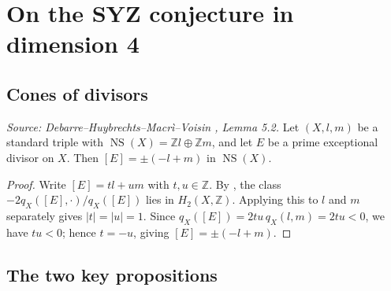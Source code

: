 \section{On the SYZ conjecture in dimension 4}

\subsection{Cones of divisors}

\begin{lemma}
  \label{lem:prime-exceptional-class}
  \textit{Source: Debarre--Huybrechts--Macr\`i--Voisin \cite{MR4654610}, Lemma 5.2.}
  Let \((X, l, m)\) be a standard triple with
  \(\operatorname{NS}(X) = \mathbb{Z}l \oplus \mathbb{Z}m\), and let \(E\) be a prime
  exceptional divisor on \(X\).  Then \([E] = \pm(-l + m)\) in \(\operatorname{NS}(X)\).
\end{lemma}

\begin{proof}
  Write \([E] = tl + um\) with \(t, u \in \mathbb{Z}\).  By
  \cite[Corollary~3.6]{mar}, the class \(-2q_X([E], \cdot)/q_X([E])\) lies in
  \(H_2(X, \mathbb{Z})\).  Applying this to \(l\) and \(m\) separately gives
  \(|t| = |u| = 1\).  Since \(q_X([E]) = 2tu\,q_X(l,m) = 2tu < 0\), we have
  \(tu < 0\); hence \(t = -u\), giving \([E] = \pm(-l + m)\).
\end{proof}

\subsection{The two key propositions}


